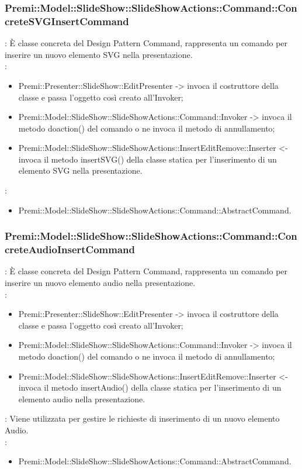 {                    \subsubsection{Premi::Model::SlideShow::SlideShowActions::Command::ConcreteSVGInsertCommand}{
				\textbf{\tipo}: È classe concreta del Design Pattern Command, rappresenta un comando per inserire un nuovo elemento SVG nella presentazione.\\	
				\textbf{\relaz}: 
				\begin{itemize}
					\item Premi::Presenter::SlideShow::EditPresenter -> invoca il costruttore della classe e passa l’oggetto così creato all’Invoker;
					\item Premi::Model::SlideShow::SlideShowActions::Command::Invoker -> invoca il metodo doaction() del comando o ne invoca il metodo di annullamento;
                    \item Premi::Model::SlideShow::SlideShowActions::InsertEditRemove::Inserter <- invoca il metodo insertSVG() della classe statica per l’inserimento di un elemento SVG nella presentazione.
				\end{itemize}	
                \textbf{\base}: 
                    \begin{itemize}
                    \item Premi::Model::SlideShow::SlideShowActions::Command::AbstractCommand.
                    \end{itemize}
                    }
                \subsubsection{Premi::Model::SlideShow::SlideShowActions::Command::ConcreteAudioInsertCommand}{
				\textbf{\tipo}: È classe concreta del Design Pattern Command, rappresenta un comando per inserire un nuovo elemento audio nella presentazione.\\	
				\textbf{\relaz}: 
				\begin{itemize}
					\item Premi::Presenter::SlideShow::EditPresenter -> invoca il costruttore della classe e passa l’oggetto così creato all’Invoker;
					\item Premi::Model::SlideShow::SlideShowActions::Command::Invoker -> invoca il metodo doaction() del comando o ne invoca il metodo di annullamento;
                    \item Premi::Model::SlideShow::SlideShowActions::InsertEditRemove::Inserter <- invoca il metodo insertAudio() della classe statica per l’inserimento di un elemento audio nella presentazione.
				\end{itemize}	
                \textbf{\interfacce}: Viene utilizzata per gestire le richieste di inserimento di un nuovo elemento Audio.\\
                \textbf{\base}: 
                    \begin{itemize}
                    \item Premi::Model::SlideShow::SlideShowActions::Command::AbstractCommand.
                    \end{itemize}
                    }
}

